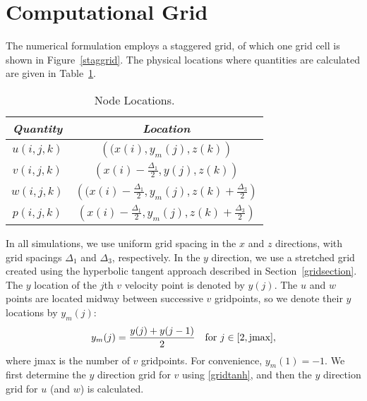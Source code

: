 \documentclass[10pt]{article}
\begin{document}
\section{Computational Grid}\label{grid}
%
% 
The numerical formulation employs a staggered grid, of which one grid cell is shown in Figure~\ref{staggrid}.  The physical locations where quantities are calculated are given in Table~\ref{gridtbl}.  
\begin{table}[p]
\begin{center}
\caption{Node Locations.}
\label{gridtbl}
\begin{tabular}{|c|c|}\hline
\textit{Quantity} & \textit{Location}\\ \hline %
$u(i,j,k)$  & $\left((x(i),y_m(j),z(k)\right)$   \\ \hline
$v(i,j,k)$  & $\left(x(i)-\frac{\Delta_1}{2},y(j), z(k)\right)$ \\ \hline
$w(i,j,k)$&$\left((x(i)-\frac{\Delta_1}{2},y_m(j),z(k)+\frac{\Delta_3}{2}\right)$ \\ \hline
$p(i,j,k)$  & $\left(x(i)-\frac{\Delta_1}{2},y_m(j),z(k)+\frac{\Delta_3}{2}\right)$ \\ \hline
\end{tabular}
\end{center}
\end{table}
%
In all simulations, we use uniform grid spacing in the $x$ and $z$
directions, with grid spacings $\Delta_1$ and $\Delta_3$,
respectively.  In the $y$ direction, we use a stretched grid created
using the hyperbolic tangent approach described in
Section~\ref{gridsection}.  The $y$ location of the $j$th $v$ velocity
point is denoted by $y(j)$.  The $u$ and $w$ points are located midway
between successive $v$ gridpoints, so we denote their $y$ locations by
$y_m(j)$:
\begin{equation}
y_m(j)=\frac{y(j)+y(j-1)}{2}\ \ \hbox{ for }j\in[2,\hbox{jmax}],
\end{equation}
where jmax is the number of $v$ gridpoints.  For convenience,
$y_m(1)=-1$.  We first determine the $y$ direction grid for $v$ using
\autoref{gridtanh}, and then the $y$ direction grid for $u$ (and
$w$) is calculated.
%
\end{document}
